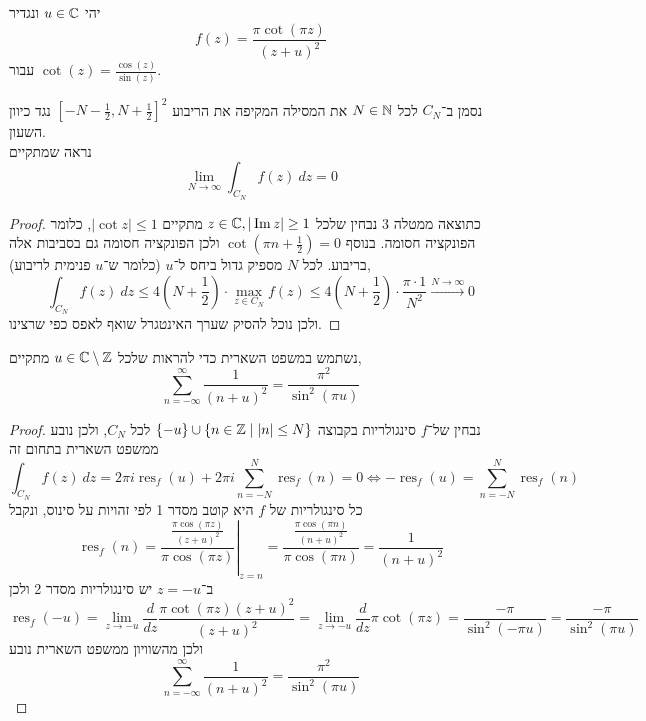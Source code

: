 \question{}
יהי $u \in \mathbb{C}$ ונגדיר
\[
	f(z)
	= \frac{\pi \cot(\pi z)}{{(z + u)}^2}
\]
עבור $\cot(z) = \frac{\cos(z)}{\sin(z)}$.

\subquestion{}
נסמן ב־$C_N$ לכל $N \in \mathbb{N}$ את המסילה המקיפה את הריבוע ${[-N - \frac{1}{2}, N + \frac{1}{2}]}^2$ נגד כיוון השעון. \\
נראה שמתקיים
\[
	\lim_{N \to \infty} \int_{C_N} f(z)\ dz
	= 0
\]
\begin{proof}
	כתוצאה ממטלה 3 נבחין שלכל $z \in \mathbb{C}, |\operatorname{Im} z| \ge 1$ מתקיים $|\cot z| \le 1$, כלומר הפונקציה חסומה.
	בנוסף $\cot(\pi n + \frac{1}{2}) = 0$ ולכן הפונקציה חסומה גם בסביבות אלה בריבוע.
	לכל $N$ מספיק גדול ביחס ל־$u$ (כלומר ש־$u$ פנימית לריבוע),
	\[
		\int_{C_N} f(z)\ dz
		\le 4(N + \frac{1}{2}) \cdot \max_{z \in C_N} f(z)
		\le 4(N + \frac{1}{2}) \cdot \frac{\pi \cdot 1}{N^2}
		\xrightarrow{N \to \infty} 0
	\]
	ולכן נוכל להסיק שערך האינטגרל שואף לאפס כפי שרצינו.
\end{proof}

\subquestion{}
נשתמש במשפט השארית כדי להראות שלכל $u \in \mathbb{C} \setminus \mathbb{Z}$ מתקיים,
\[
	\sum_{n = -\infty}^{\infty} \frac{1}{{(n + u)}^2}
	= \frac{\pi^2}{\sin^2(\pi u)}
\]
\begin{proof}
	נבחין של־$f$ סינגולריות בקבוצה $\{ -u \} \cup \{ n \in \mathbb{Z} \mid |n| \le N \}$ לכל $C_N$, ולכן נובע ממשפט השארית בתחום זה
	\[
		\int_{C_N} f(z)\ dz
		= 2\pi i \operatorname{res}_f(u) + 2\pi i \sum_{n = -N}^{N} \operatorname{res}_f(n)
		= 0
		\iff
		-\operatorname{res}_f(u) = \sum_{n = -N}^{N} \operatorname{res}_f(n)
	\]
	כל סינגולריות של $f$ היא קוטב מסדר 1 לפי זהויות על סינוס, ונקבל
	\[
		\operatorname{res}_f(n)
		= \left. \frac{\frac{\pi \cos(\pi z)}{{(z + u)}^2}}{\pi \cos(\pi z)} \right\rvert_{z = n}
		= \frac{\frac{\pi \cos(\pi n)}{{(n + u)}^2}}{\pi \cos(\pi n)}
		= \frac{1}{{(n + u)}^2}
	\]
	ב־$z = -u$ יש סינגולריות מסדר 2 ולכן
	\[
		\operatorname{res}_f(-u)
		= \lim_{z \to -u} \frac{d}{dz} \frac{\pi \cot(\pi z) {(z + u)}^2}{{(z + u)}^2}
		= \lim_{z \to -u} \frac{d}{dz} \pi \cot(\pi z)
		= \frac{-\pi}{\sin^2(-\pi u)}
		= \frac{-\pi}{\sin^2(\pi u)}
	\]
	ולכן מהשוויון ממשפט השארית נובע
	\[
		\sum_{n = -\infty}^{\infty} \frac{1}{{(n + u)}^2}
		= \frac{\pi^2}{\sin^2(\pi u)}
	\]
\end{proof}

